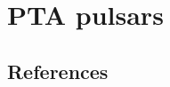 \documentclass[fleqn,usenatbib,useAMS]{mnras}
\begin{document}
\cite{Vargas}


\section{PTA pulsars}








\subsection{References}
\label{sec:ref_list}













\bsp	%
\label{lastpage}
\end{document}
